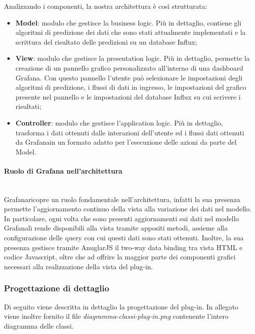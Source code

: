 Analizzando i componenti, la nostra architettura è così strutturata: 
\begin{itemize}
	\item \textbf{Model}: modulo che gestisce la business logic\glo. Più in dettaglio, contiene gli algoritmi di predizione dei dati che sono stati attualmente implementati e la scrittura del risultato delle predizioni su un database Influx;
	\item \textbf{View}: modulo che gestisce la presentation logic. Più in dettaglio, permette la creazione di un pannello grafico personalizzato all'interno di una dashboard Grafana\glo. Con questo pannello l'utente può selezionare le impostazioni degli algoritmi di predizione, i flussi di dati in ingresso, le impostazioni del grafico presente nel pannello e le impostazioni del database Influx su cui scrivere i risultati;
	\item \textbf{Controller}: modulo che gestisce l'application logic. Più in dettaglio, trasforma i dati ottenuti dalle interazioni dell'utente ed i flussi dati ottenuti da Grafana\glosp in un formato adatto per l'esecuzione delle azioni da parte del Model.
\end{itemize}
\paragraph{Ruolo di Grafana nell'architettura} \mbox{}\\ [1mm]
Grafana\glosp ricopre un ruolo fondamentale nell'architettura, infatti la sua presenza permette l'aggiornamento continuo della vista alla variazione dei dati nel modello. In particolare, ogni volta che sono presenti aggiornamenti sui dati nel modello Grafana\glosp li rende disponibili alla vista tramite appositi metodi, assieme alla configurazione delle query con cui questi dati sono stati ottenuti. Inoltre, la sua presenza gestisce tramite AnuglarJS il two-way data binding tra vista HTML e codice Javascript, oltre che ad offrire la maggior parte dei componenti grafici necessari alla realizzazione della vista del plug-in.
\subsubsection{Progettazione di dettaglio}
Di seguito viene descritta in dettaglio la progettazione del plug-in. In allegato viene inoltre fornito il file \textit{diagramma-classi-plug-in.png} contenente l'intero diagramma delle classi.
